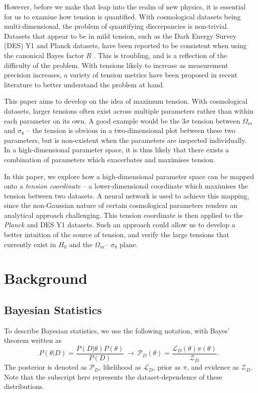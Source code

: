 \documentclass[%
 reprint,
 amsmath,amssymb,
 aps,
]{revtex4-2}
\begin{document}
However, before we make that leap into the realm of new physics, it is essential for us to examine how tension is quantified. With cosmological datasets being multi-dimensional, the problem of quantifying discrepancies is non-trivial. Datasets that appear to be in mild tension, such as the Dark Energy Survey (DES) Y1 and Planck datasets, have been reported to be consistent when using the canonical Bayes factor $R$ \cite{Handley2019}. This is troubling, and is a reflection of the difficulty of the problem. With tensions likely to increase as measurement precision increases, a variety of tension metrics have been proposed in recent literature \cite{Charnock2017} to better understand the problem at hand.

This paper aims to develop on the idea of maximum tension. With cosmological datasets, larger tensions often exist across multiple parameters rather than within each parameter on its own. A good example would be the $3 \sigma$ tension between $\Omega_m$ and $\sigma_8$ -- the tension is obvious in a two-dimensional plot between these two parameters, but is non-existent when the parameters are inspected individually. In a high-dimensional parameter space, it is thus likely that there exists a combination of parameters which exacerbates and maximises tension.

In this paper, we explore how a high-dimensional parameter space can be mapped onto a \textit{tension coordinate} -- a lower-dimensional coordinate which maximises the tension between two datasets. A neural network is used to achieve this mapping, since the non-Gaussian nature of certain cosmological parameters renders an analytical approach challenging. This tension coordinate is then applied to the \textit{Planck} and DES Y1 datasets. Such an approach could allow us to develop a better intuition of the source of tension, and verify the large tensions that currently exist in $H_0$ and the $\Omega_m$-- $\sigma_8$ plane.



\section{Background}

\subsection{Bayesian Statistics}

To describe Bayesian statistics, we use the following notation, with Bayes' theorem written as
\begin{equation}
    P(\theta|D) = \frac{P(D|\theta)P(\theta)}{P(D)} \, \longrightarrow \, \mathcal{P}_D(\theta) = \frac{\mathcal{L}_D(\theta) \pi(\theta)}{\mathcal{Z}_D}.
\end{equation}
The posterior is denoted as $\mathcal{P}_D$, likelihood as $\mathcal{L}_D$, prior as $\pi$, and evidence as $\mathcal{Z}_D$. Note that the subscript here represents the dataset-dependence of these distributions. 
\end{document}
